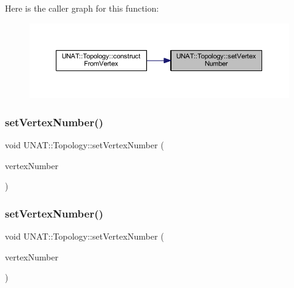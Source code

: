Here is the caller graph for this function\+:
\nopagebreak
\begin{figure}[H]
\begin{center}
\leavevmode
\includegraphics[width=350pt]{classUNAT_1_1Topology_aeddafa74ad2dc0769cf5e0a3384a20ce_icgraph}
\end{center}
\end{figure}
\mbox{\label{classUNAT_1_1Topology_aeddafa74ad2dc0769cf5e0a3384a20ce}} 
\subsubsection{\texorpdfstring{setVertexNumber()}{setVertexNumber()}\hspace{0.1cm}{\footnotesize\ttfamily [2/3]}}
{\footnotesize\ttfamily void U\+N\+A\+T\+::\+Topology\+::set\+Vertex\+Number (\begin{DoxyParamCaption}\item[{\mbox{\hyperlink{include_2swMacro_8h_a113cf5f6b5377cdf3fac6aa4e443e9aa}{sw\+Int}}}]{vertex\+Number }\end{DoxyParamCaption})\hspace{0.3cm}{\ttfamily [inline]}}

\mbox{\label{classUNAT_1_1Topology_aeddafa74ad2dc0769cf5e0a3384a20ce}} 
\subsubsection{\texorpdfstring{setVertexNumber()}{setVertexNumber()}\hspace{0.1cm}{\footnotesize\ttfamily [3/3]}}
{\footnotesize\ttfamily void U\+N\+A\+T\+::\+Topology\+::set\+Vertex\+Number (\begin{DoxyParamCaption}\item[{\mbox{\hyperlink{include_2swMacro_8h_a113cf5f6b5377cdf3fac6aa4e443e9aa}{sw\+Int}}}]{vertex\+Number }\end{DoxyParamCaption})\hspace{0.3cm}{\ttfamily [inline]}}

